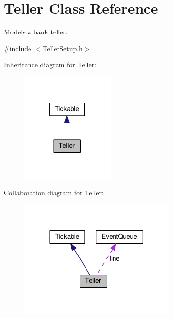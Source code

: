 \hypertarget{class_teller}{}\section{Teller Class Reference}
\label{class_teller}


Models a bank teller.  




{\ttfamily \#include $<$Teller\+Setup.\+h$>$}



Inheritance diagram for Teller\+:
\nopagebreak
\begin{figure}[H]
\begin{center}
\leavevmode
\includegraphics[width=133pt]{class_teller__inherit__graph}
\end{center}
\end{figure}


Collaboration diagram for Teller\+:
\nopagebreak
\begin{figure}[H]
\begin{center}
\leavevmode
\includegraphics[width=222pt]{class_teller__coll__graph}
\end{center}
\end{figure}
